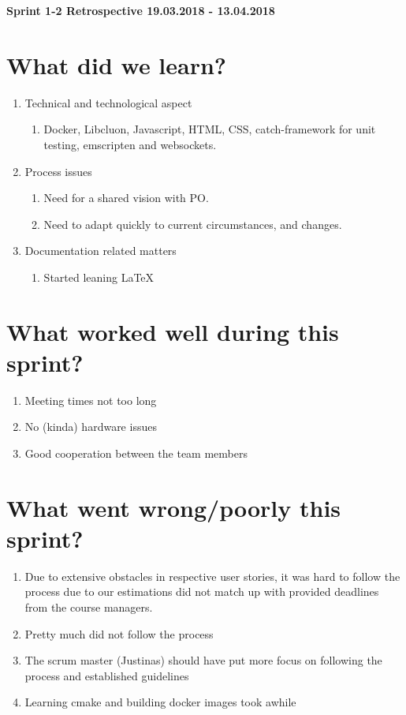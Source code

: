 \documentclass[11pt]{article}
\begin{document}
\centerline{\textbf{\LARGE Sprint 1-2 Retrospective 19.03.2018 - 13.04.2018}}

\section*{What did we learn?}
\begin{enumerate}
	\item Technical and technological aspect
		\begin{enumerate} 
			\item Docker, Libcluon, Javascript, HTML, CSS, catch-framework for unit testing, emscripten and websockets.
		\end{enumerate} 
	\item Process issues
		\begin{enumerate} 
			\item Need for a shared vision with PO.
			\item Need to adapt quickly to current circumstances, and changes.
		\end{enumerate}		
	\item Documentation related matters
		\begin{enumerate} 
			\item Started leaning LaTeX
		\end{enumerate}	
\end{enumerate} 

\section*{What worked well during this sprint?}
\begin{enumerate}
	\item Meeting times not too long 
	\item No (kinda) hardware issues 
	\item Good cooperation between the team members
\end{enumerate} 

\section*{What went wrong/poorly this sprint?}
\begin{enumerate}
	\item Due to extensive obstacles in respective user stories, it was hard to follow the process due to our estimations did not match up with provided deadlines from the course managers.
	\item Pretty much did not follow the process
	\item The scrum master (Justinas) should have put more focus on following the process and established guidelines
	\item Learning cmake and building docker images took awhile
\end{enumerate} 
\end{document}
